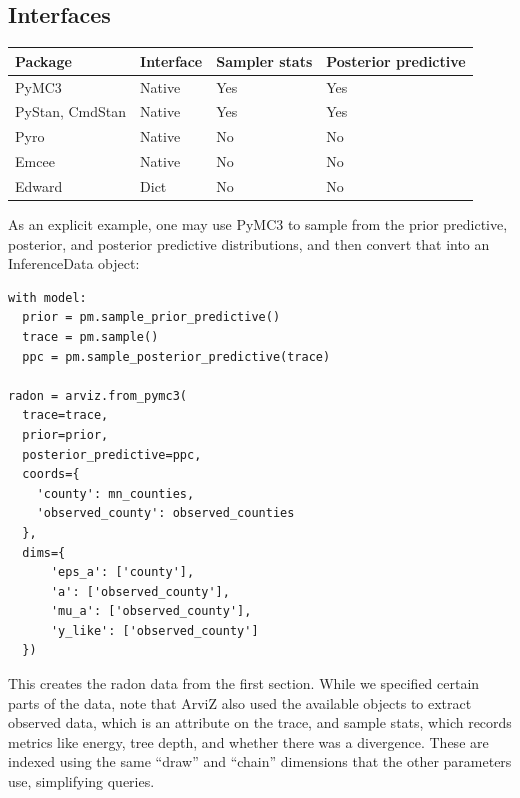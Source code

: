 \documentclass[a0,portrait]{a0poster}
\begin{document}
\begin{multicols}{3}
\section{Interfaces}

\begin{center}\begin{tabular}{|l|l|l|l|}
	\hline
	\textbf{Package} & \textbf{Interface} & \textbf{Sampler stats} & \textbf{Posterior predictive} \\
    \hline
    PyMC3 & Native & Yes & Yes \\
    \hline
    PyStan, CmdStan & Native & Yes & Yes \\
    \hline
    Pyro & Native & No & No \\
    \hline
    Emcee & Native & No & No \\
    \hline
    Edward & Dict & No & No \\
    \hline
\end{tabular}\end{center}\vspace{1cm}

As an explicit example, one may use PyMC3 to sample from the prior predictive, posterior, and posterior predictive distributions, and then convert that into an InferenceData object:

\begin{lstlisting}
with model:
  prior = pm.sample_prior_predictive()
  trace = pm.sample()
  ppc = pm.sample_posterior_predictive(trace)

radon = arviz.from_pymc3(
  trace=trace,
  prior=prior,
  posterior_predictive=ppc,
  coords={
    'county': mn_counties,
    'observed_county': observed_counties
  },
  dims={
      'eps_a': ['county'],
      'a': ['observed_county'],
      'mu_a': ['observed_county'],
      'y_like': ['observed_county']
  })
\end{lstlisting}

This creates the radon data from the first section. While we specified certain parts of the data, note that ArviZ also used the available objects to extract observed data, which is an attribute on the trace, and sample stats, which records metrics like energy, tree depth, and whether there was a divergence. These are indexed using the same ``draw'' and ``chain'' dimensions that the other parameters use, simplifying queries.


\end{multicols}
\end{document}
